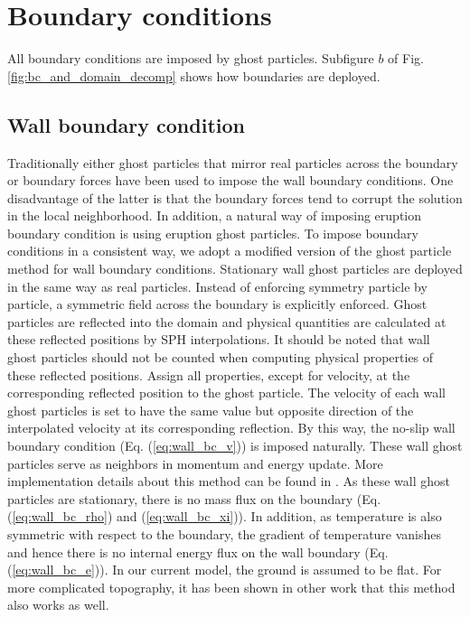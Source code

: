 \section{Boundary conditions} \label{sec:SPH-bc}
All boundary conditions are imposed by ghost particles. Subfigure $b$ of Fig. \ref{fig:bc_and_domain_decomp} shows how boundaries are deployed. 
\subsection{Wall boundary condition}
Traditionally either ghost particles that mirror real particles across the boundary \citep {ferrari2009new} or boundary forces \citep {monaghan2009sph} have been used to impose the wall boundary conditions. One disadvantage of the latter  is that the boundary forces tend to corrupt the solution in the local neighborhood. In addition, a natural way of imposing eruption boundary condition is using eruption ghost particles. To impose boundary conditions in a consistent way, we adopt a modified version of the ghost particle method \citep {kumar2013parallel} for wall boundary conditions. Stationary wall ghost particles are deployed in the same way as real particles. Instead of enforcing symmetry particle by particle, a symmetric field across the boundary is explicitly enforced. Ghost particles are reflected into the domain and physical quantities are calculated at these reflected positions by SPH interpolations. It should be noted that wall ghost particles should not be counted when computing physical properties of these reflected positions. Assign all properties, except for velocity, at the corresponding reflected position to the ghost particle. The velocity of each wall ghost particles is set to have the same value but opposite direction of the interpolated velocity at its corresponding reflection. By this way, the no-slip wall boundary condition (Eq. (\ref{eq:wall_bc_v})) is imposed naturally. These wall ghost particles serve as neighbors in momentum and energy update. More implementation details about this method can be found in \citep {kumar2013parallel}. As these wall ghost particles are stationary, there is no mass flux on the boundary (Eq. (\ref{eq:wall_bc_rho}) and (\ref{eq:wall_bc_xi})). In addition, as temperature is also symmetric with respect to the boundary, the gradient of temperature vanishes and hence there is no internal energy flux on the wall boundary (Eq. (\ref{eq:wall_bc_e})). 
In our current model, the ground is assumed to be  flat. For more complicated topography, it has been shown in other work \citep {kumar2013parallel} that this method also works as well.

